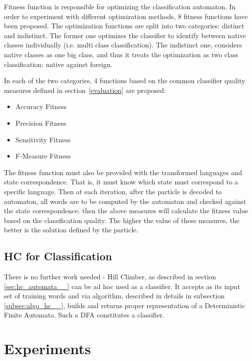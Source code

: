 \documentclass{mini}
\begin{document}
Fitness function is responsible for optimizing the classification automaton. In order to experiment with different optimization methods, 8 fitness functions have been proposed. The optimization functions are split into two categories: distinct and indistinct. The former one optimizes the classifier to identify between native classes individually (i.e. multi class classification). The indistinct one, considers native classes as one big class, and thus it treats the optimization as two class classification: native against foreign.

In each of the two categories, 4 functions based on the common classifier quality measures defined in section~\ref{evaluation} are proposed:
\begin{itemize}
    \item Accuracy Fitness
    \item Precision Fitness
    \item Sensitivity Fitness
    \item F-Measure Fitness
\end{itemize}

The fitness function must also be provided with the transformed languages and state correspondence. That is, it must know which state must correspond to a specific language. Then at each iteration, after the particle is decoded to automaton, all words are to be computed by the automaton and checked against the state correspondence. then the above measures will calculate the fitness value based on the classification quality. The higher the value of these measures, the better is the solution defined by the particle.

\section{HC for Classification}
There is no further work needed - Hill Climber, as described in section \ref{sec:hc_automata__} can be ad hoc used as a classifier. It accepts as its input set of training words and via algorithm, described in details in subsection \ref{subsec:algo_hc__}, builds and returns proper representation of a Deterministic Finite Automata. Such a DFA constitutes a classifier.


\chapter{Experiments}\label{chap:experiments}
\end{document}
